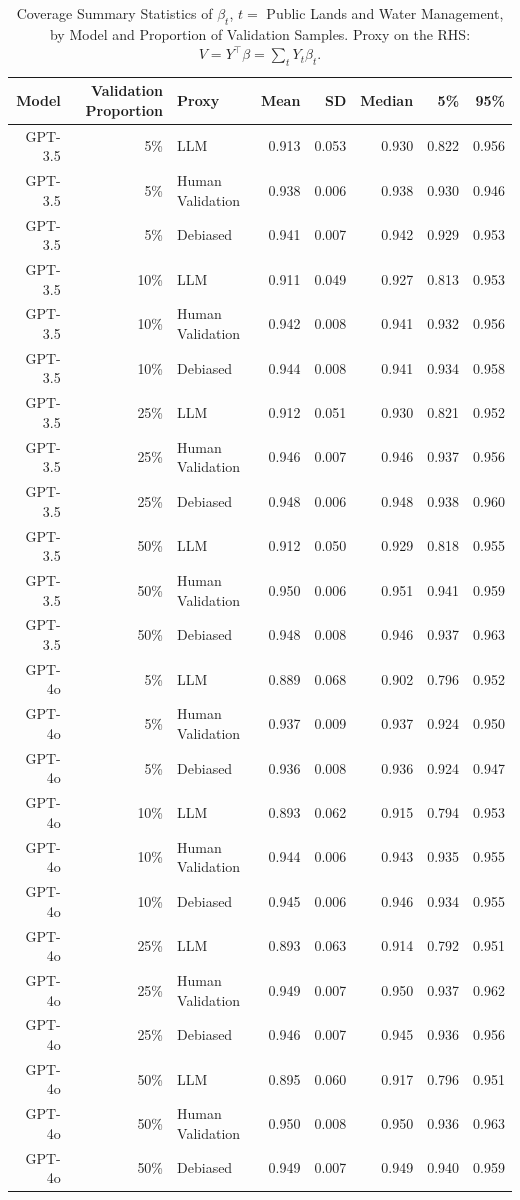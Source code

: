 \begin{table}

\caption{Coverage Summary Statistics of $\beta_{t}$, $t=$ Public Lands and Water Management, by Model and Proportion of Validation Samples.
      Proxy on the RHS: $V = Y^\top \beta = \sum_{t} Y_t \beta_t$.}
\centering
\begin{tabular}[t]{rrlrrrrr}
\toprule
Model & Validation Proportion & Proxy & Mean & SD & Median & 5\% & 95\%\\
\midrule
GPT-3.5 & 5\% & LLM & 0.913 & 0.053 & 0.930 & 0.822 & 0.956\\
GPT-3.5 & 5\% & Human Validation & 0.938 & 0.006 & 0.938 & 0.930 & 0.946\\
GPT-3.5 & 5\% & Debiased & 0.941 & 0.007 & 0.942 & 0.929 & 0.953\\
GPT-3.5 & 10\% & LLM & 0.911 & 0.049 & 0.927 & 0.813 & 0.953\\
GPT-3.5 & 10\% & Human Validation & 0.942 & 0.008 & 0.941 & 0.932 & 0.956\\
GPT-3.5 & 10\% & Debiased & 0.944 & 0.008 & 0.941 & 0.934 & 0.958\\
GPT-3.5 & 25\% & LLM & 0.912 & 0.051 & 0.930 & 0.821 & 0.952\\
GPT-3.5 & 25\% & Human Validation & 0.946 & 0.007 & 0.946 & 0.937 & 0.956\\
GPT-3.5 & 25\% & Debiased & 0.948 & 0.006 & 0.948 & 0.938 & 0.960\\
GPT-3.5 & 50\% & LLM & 0.912 & 0.050 & 0.929 & 0.818 & 0.955\\
GPT-3.5 & 50\% & Human Validation & 0.950 & 0.006 & 0.951 & 0.941 & 0.959\\
GPT-3.5 & 50\% & Debiased & 0.948 & 0.008 & 0.946 & 0.937 & 0.963\\
GPT-4o & 5\% & LLM & 0.889 & 0.068 & 0.902 & 0.796 & 0.952\\
GPT-4o & 5\% & Human Validation & 0.937 & 0.009 & 0.937 & 0.924 & 0.950\\
GPT-4o & 5\% & Debiased & 0.936 & 0.008 & 0.936 & 0.924 & 0.947\\
GPT-4o & 10\% & LLM & 0.893 & 0.062 & 0.915 & 0.794 & 0.953\\
GPT-4o & 10\% & Human Validation & 0.944 & 0.006 & 0.943 & 0.935 & 0.955\\
GPT-4o & 10\% & Debiased & 0.945 & 0.006 & 0.946 & 0.934 & 0.955\\
GPT-4o & 25\% & LLM & 0.893 & 0.063 & 0.914 & 0.792 & 0.951\\
GPT-4o & 25\% & Human Validation & 0.949 & 0.007 & 0.950 & 0.937 & 0.962\\
GPT-4o & 25\% & Debiased & 0.946 & 0.007 & 0.945 & 0.936 & 0.956\\
GPT-4o & 50\% & LLM & 0.895 & 0.060 & 0.917 & 0.796 & 0.951\\
GPT-4o & 50\% & Human Validation & 0.950 & 0.008 & 0.950 & 0.936 & 0.963\\
GPT-4o & 50\% & Debiased & 0.949 & 0.007 & 0.949 & 0.940 & 0.959\\
\bottomrule
\end{tabular}
\end{table}
